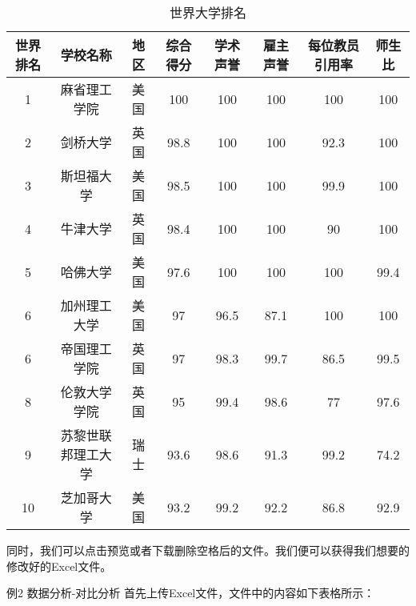 \begin{table}[h]
    \centering
    \footnotesize
    \begin{tabular}{cccccccc}
        \toprule
        世界排名 & 学校名称 & 地区 & 综合得分 & 学术声誉 & 雇主声誉 & 每位教员引用率 & 师生比 \\
        \midrule
        1  & 麻省理工学院     & 美国 & 100  & 100  & 100  & 100  & 100  \\
        2  & 剑桥大学         & 英国 & 98.8 & 100  & 100  & 92.3 & 100  \\
        3  & 斯坦福大学       & 美国 & 98.5 & 100  & 100  & 99.9 & 100  \\
        4  & 牛津大学         & 英国 & 98.4 & 100  & 100  & 90   & 100  \\
        5  & 哈佛大学         & 美国 & 97.6 & 100  & 100  & 100  & 99.4 \\
        6  & 加州理工大学     & 美国 & 97   & 96.5 & 87.1 & 100  & 100  \\
        6  & 帝国理工学院     & 英国 & 97   & 98.3 & 99.7 & 86.5 & 99.5 \\
        8  & 伦敦大学学院     & 英国 & 95   & 99.4 & 98.6 & 77   & 97.6 \\
        9  & 苏黎世联邦理工大学 & 瑞士 & 93.6 & 98.6 & 91.3 & 99.2 & 74.2 \\
        10 & 芝加哥大学       & 美国 & 93.2 & 99.2 & 92.2 & 86.8 & 92.9 \\
        \bottomrule
    \end{tabular}
    \caption{世界大学排名}
    \label{tab:world_ranking}
\end{table}
\FloatBarrier
同时，我们可以点击预览或者下载删除空格后的文件。我们便可以获得我们想要的修改好的Excel文件。


例2 数据分析-对比分析
首先上传Excel文件，文件中的内容如下表格所示：


